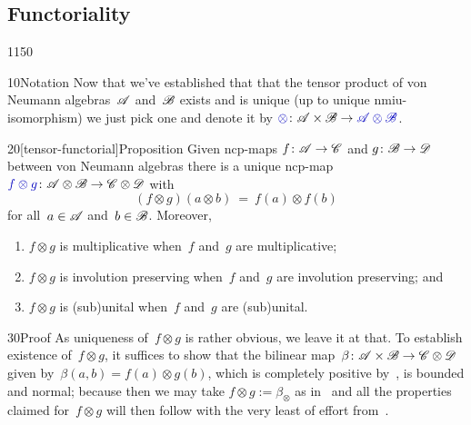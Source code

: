 \subsection{Functoriality}
\begin{parsec}{1150}%
\begin{point}{10}{Notation}%
Now that we've established
that that the tensor product
of von Neumann algebras~$\mathscr{A}$ and~$\mathscr{B}$
exists and is unique (up to unique nmiu-isomorphism)
we just pick one and denote it by $\Define{\otimes}\colon
\scrA\times\scrB\to\Define{\scrA\otimes\scrB}$.%
%
\end{point}
\begin{point}{20}[tensor-functorial]{Proposition}%
Given ncp-maps $f\colon \mathscr{A}\to\mathscr{C}$
and $g\colon \mathscr{B}\to\mathscr{D}$
between von Neumann algebras
there is a unique ncp-map
$\Define{f\otimes g}\colon \scrA\otimes\scrB\to\scrC\otimes\scrD$
with 
\begin{equation*}
	(f\otimes g)(a\otimes b) \ =\ f(a)\otimes f(b)
\end{equation*}%
for all~$a\in\mathscr{A}$ and~$b\in\mathscr{B}$.
Moreover,
\begin{enumerate}
\item
$f\otimes g$ is multiplicative 
when~$f$ and~$g$ are multiplicative;
\item
$f\otimes g$ is involution preserving
when~$f$ and~$g$ are involution preserving; and
\item
$f\otimes g$ is (sub)unital 
when~$f$ and~$g$ are (sub)unital.
\end{enumerate}
\spacingfix%
\begin{point}{30}{Proof}%
As uniqueness of~$f\otimes g$ is rather obvious,
we leave it at that.
To establish
existence of~$f\otimes g$,
it suffices to show
that the bilinear map~$\beta\colon \mathscr{A}\times\mathscr{B}\to\mathscr{C}\otimes\mathscr{D}$
given by~$\beta(a,b)=f(a)\otimes g(b)$,
which is completely positive by~,
is bounded and normal;
because then we may take $f\otimes g:=\beta_\otimes$%
as in~
and all
the properties claimed for~$f\otimes g$ will then  follow 
with the very least of effort
from~.


\end{point}
\end{point}
\end{parsec}
